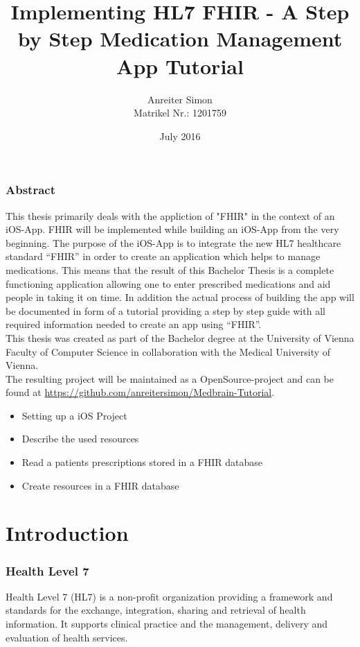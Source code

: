 \documentclass{article}
\title{Implementing HL7 FHIR - A Step by Step Medication Management App Tutorial}
\author{
    \large{Anreiter Simon} \\
    \small{Matrikel Nr.: 1201759}
}
\date{July 2016}
\begin{document}


\section*{Abstract}
This thesis primarily deals with the appliction of "FHIR" in the context of an iOS-App.
FHIR will be implemented while building an iOS-App from the very beginning. The purpose of the iOS-App is to integrate the new HL7 healthcare standard “FHIR” in order to create an application which helps to manage medications. This means that the result of this Bachelor Thesis is a complete functioning application allowing one to enter prescribed medications and aid people in taking it on time. In addition the actual process of building the app will be documented in form of a tutorial providing a step by step guide with all required information needed to create an app using “FHIR”.
\\
This thesis was created as part of the Bachelor degree at the University of Vienna Faculty of Computer Science in collaboration with the Medical University of Vienna.
\\
The resulting project will be maintained as a OpenSource-project and can be found at \url{https://github.com/anreitersimon/Medbrain-Tutorial}.
\\
\begin{itemize}
  \item
    Setting up a iOS Project
  \item
    Describe the used resources
  \item
    Read a patients prescriptions stored in a FHIR database
  \item
    Create resources in a FHIR database
\end{itemize}
\newpage

\tableofcontents
\newpage


\part{Introduction}
\section{Health Level 7}
Health Level 7 (HL7) is a non-profit organization providing a framework and standards for the exchange, integration, sharing and retrieval of health information.
It supports clinical practice and the management, delivery and evaluation of health services. \citep{01-hl7}
\end{document}
